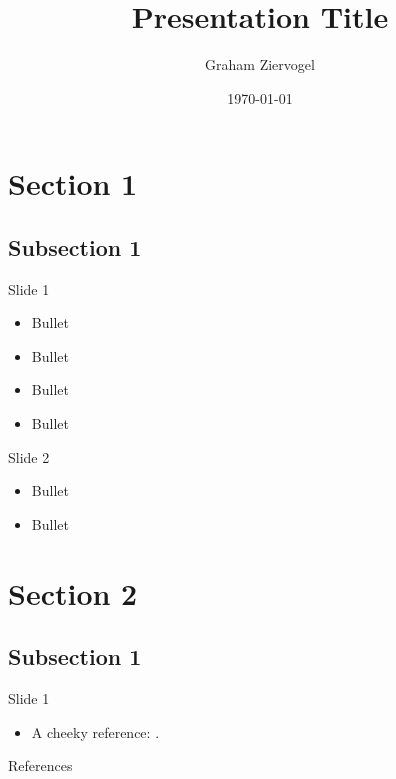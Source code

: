\documentclass[10pt]{beamer}
\title{Presentation Title}
\author{Graham Ziervogel}
\institute{Organisation}
\date{\today}
\begin{document}
\begin{frame}
	\titlepage
\end{frame}

\section{Section 1}
\subsection{Subsection 1}

\begin{frame}{Slide 1}
\begin{itemize}
\pause
\item Bullet
\pause
\item Bullet
\pause
\item Bullet
\pause
\item Bullet
\end{itemize}
\end{frame}

\begin{frame}{Slide 2}
\begin{itemize}
\pause
\item Bullet
\pause
\item Bullet
\end{itemize}
\end{frame}

\section{Section 2}
\subsection{Subsection 1}

\begin{frame}{Slide 1}
\begin{itemize}
\pause
\item A cheeky reference: \cite{AA14}.
\end{itemize}
\end{frame}

\begin{frame}{References}
	\footnotesize
	
	
\end{frame}
\end{document}
